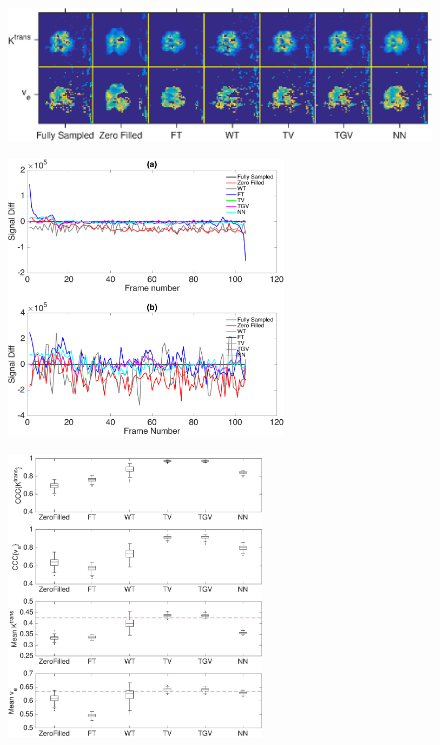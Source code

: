 \documentclass{beamer}
\newcommand{\kt}{$K^\mathrm{trans}$}
\newcommand{\Ve}{$v_\mathrm{e}$}
\begin{document}
\begin{frame}
	\begin{figure}[htbp]
\centerline{\includegraphics[width=1\textwidth]{../img/qetsr/figure4.eps}}
\end{figure}
\end{frame}

\begin{frame}
	\begin{figure}[htbp]
\centerline{\includegraphics[width=0.65\textwidth]{../img/qetsr/figure6}}
\end{figure}
\end{frame}

\begin{frame}
\begin{figure}[htbp]
\centerline{
    \includegraphics[width=0.6\textwidth]{../img/qetsr/figure7.eps}
}
\end{figure}
\end{frame}
\end{document}
